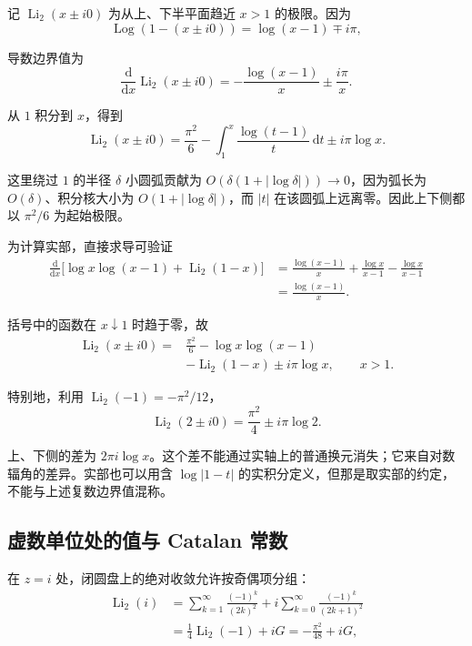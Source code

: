 \documentclass[11pt,a4paper]{article}
\begin{document}
记 \(\operatorname{Li}_2(x\pm i0)\) 为从上、下半平面趋近 \(x>1\)
的极限。因为
\[
\operatorname{Log}(1-(x\pm i0))=\log(x-1)\mp i\pi,
\]

导数边界值为
\[
\frac{\mathrm d}{\mathrm dx}\operatorname{Li}_2(x\pm i0)
=-\frac{\log(x-1)}x\pm\frac{i\pi}x.
\]

从 \(1\) 积分到 \(x\)，得到
\[
\operatorname{Li}_2(x\pm i0)
=\frac{\pi^2}{6}-\int_1^x\frac{\log(t-1)}t\,\mathrm dt
\pm i\pi\log x.
\]

这里绕过 \(1\) 的半径 \(\delta\) 小圆弧贡献为
\(O(\delta(1+|\log\delta|))\to0\)，因为弧长为
\(O(\delta)\)、积分核大小为 \(O(1+|\log\delta|)\)，而 \(|t|\)
在该圆弧上远离零。因此上下侧都以 \(\pi^2/6\) 为起始极限。

为计算实部，直接求导可验证
\[
\begin{aligned}
\frac{\mathrm d}{\mathrm dx}
\bigl[\log x\log(x-1)+\operatorname{Li}_2(1-x)\bigr]
&=\frac{\log(x-1)}x+\frac{\log x}{x-1}-\frac{\log x}{x-1}\\
&=\frac{\log(x-1)}x.
\end{aligned}
\]

括号中的函数在 \(x\downarrow1\) 时趋于零，故
\[
\begin{aligned}
\operatorname{Li}_2(x\pm i0)
={}&\frac{\pi^2}{6}-\log x\log(x-1)\\
&-\operatorname{Li}_2(1-x)\pm i\pi\log x,
\qquad x>1.
\end{aligned}
\]

特别地，利用 \(\operatorname{Li}_2(-1)=-\pi^2/12\)，
\[
\operatorname{Li}_2(2\pm i0)=\frac{\pi^2}{4}\pm i\pi\log2.
\]

上、下侧的差为
\(2\pi i\log x\)。这个差不能通过实轴上的普通换元消失；它来自对数辐角的差异。实部也可以用含
\(\log|1-t|\)
的实积分定义，但那是取实部的约定，不能与上述复数边界值混称。

\hypertarget{ux865aux6570ux5355ux4f4dux5904ux7684ux503cux4e0e-catalan-ux5e38ux6570}{%
\subsection{虚数单位处的值与 Catalan
常数}\label{ux865aux6570ux5355ux4f4dux5904ux7684ux503cux4e0e-catalan-ux5e38ux6570}}

在 \(z=i\) 处，闭圆盘上的绝对收敛允许按奇偶项分组：
\[
\begin{aligned}
\operatorname{Li}_2(i)
&=\sum_{k=1}^{\infty}\frac{(-1)^k}{(2k)^2}
+i\sum_{k=0}^{\infty}\frac{(-1)^k}{(2k+1)^2}\\
&=\frac14\operatorname{Li}_2(-1)+iG
=-\frac{\pi^2}{48}+iG,
\end{aligned}
\]
\end{document}
